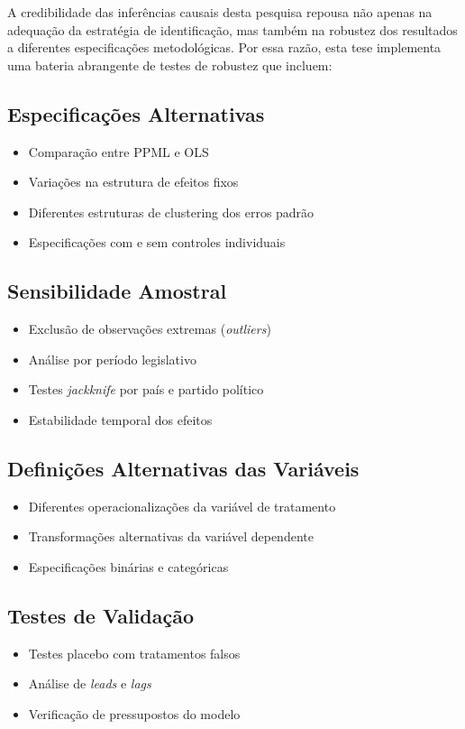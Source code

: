 A credibilidade das inferências causais desta pesquisa repousa não apenas na adequação da estratégia de identificação, mas também na robustez dos resultados a diferentes especificações metodológicas. Por essa razão, esta tese implementa uma bateria abrangente de testes de robustez que incluem:

\subsection{Especificações Alternativas}
\begin{itemize}
    \item Comparação entre PPML e OLS
    \item Variações na estrutura de efeitos fixos
    \item Diferentes estruturas de clustering dos erros padrão
    \item Especificações com e sem controles individuais
\end{itemize}

\subsection{Sensibilidade Amostral}
\begin{itemize}
    \item Exclusão de observações extremas (\textit{outliers})
    \item Análise por período legislativo
    \item Testes \textit{jackknife} por país e partido político
    \item Estabilidade temporal dos efeitos
\end{itemize}

\subsection{Definições Alternativas das Variáveis}
\begin{itemize}
    \item Diferentes operacionalizações da variável de tratamento
    \item Transformações alternativas da variável dependente
    \item Especificações binárias e categóricas
\end{itemize}

\subsection{Testes de Validação}
\begin{itemize}
    \item Testes placebo com tratamentos falsos
    \item Análise de \textit{leads} e \textit{lags}
    \item Verificação de pressupostos do modelo
\end{itemize}

